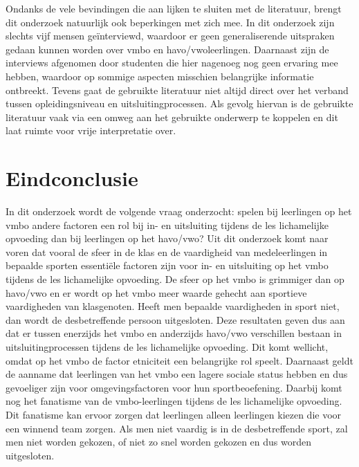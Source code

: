 \documentclass[a4paper,12pt]{memoir}
\begin{document}
Ondanks de vele bevindingen die aan lijken te sluiten met de literatuur, brengt dit onderzoek natuurlijk ook beperkingen met zich mee. In dit onderzoek zijn slechts vijf mensen geïnterviewd, waardoor er geen generaliserende uitspraken gedaan kunnen worden over vmbo en havo/vwoleerlingen. Daarnaast zijn de interviews afgenomen door studenten die hier nagenoeg nog geen ervaring mee hebben, waardoor op sommige aspecten misschien belangrijke informatie ontbreekt. Tevens gaat de gebruikte literatuur niet altijd direct over het verband tussen opleidingsniveau en uitsluitingprocessen. Als gevolg hiervan is de gebruikte literatuur vaak via een omweg aan het gebruikte onderwerp te koppelen en dit laat ruimte voor vrije interpretatie over. 

\section{Eindconclusie}

In dit onderzoek wordt de volgende vraag onderzocht: spelen bij leerlingen op het vmbo andere factoren een rol bij in- en uitsluiting tijdens de les lichamelijke opvoeding dan bij leerlingen op het havo/vwo? Uit dit onderzoek komt naar voren dat vooral de sfeer in de klas en de vaardigheid van medeleerlingen in bepaalde sporten essentiële factoren zijn voor in- en uitsluiting op het vmbo tijdens de les lichamelijke opvoeding. De sfeer op het vmbo is grimmiger dan op havo/vwo en er wordt op het vmbo meer waarde gehecht aan sportieve vaardigheden van klasgenoten. Heeft men bepaalde vaardigheden in sport niet, dan wordt de desbetreffende persoon uitgesloten. Deze resultaten geven dus aan dat er tussen enerzijds het vmbo en anderzijds havo/vwo verschillen bestaan in uitsluitingprocessen tijdens de les lichamelijke opvoeding. Dit komt wellicht, omdat op het vmbo de factor etniciteit een belangrijke rol speelt. Daarnaast geldt de aanname dat leerlingen van het vmbo een lagere sociale status hebben en dus gevoeliger zijn voor omgevingsfactoren voor hun sportbeoefening. Daarbij komt nog het fanatisme van de vmbo-leerlingen tijdens de les lichamelijke opvoeding. Dit fanatisme kan ervoor zorgen dat leerlingen alleen leerlingen kiezen die voor een winnend team zorgen. Als men niet vaardig is in de desbetreffende sport, zal men niet worden gekozen, of niet zo snel worden gekozen en dus worden uitgesloten.
\end{document}
